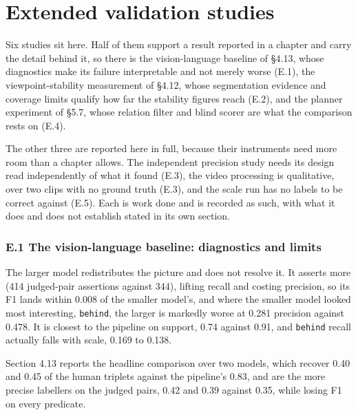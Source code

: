 \chapter{Extended validation studies}


Six studies sit here. Half of them support a result reported in a chapter and carry the detail behind it, so there is the vision-language baseline of \S{}4.13, whose diagnostics make its failure interpretable and not merely worse (E.1), the viewpoint-stability measurement of \S{}4.12, whose segmentation evidence and coverage limits qualify how far the stability figures reach (E.2), and the planner experiment of \S{}5.7, whose relation filter and blind scorer are what the comparison rests on (E.4).

The other three are reported here in full, because their instruments need more room than a chapter allows. The independent precision study needs its design read independently of what it found (E.3), the video processing is qualitative, over two clips with no ground truth (E.3), and the scale run has no labels to be correct against (E.5). Each is work done and is recorded as such, with what it does and does not establish stated in its own section.

\subsection{E.1 The vision-language baseline: diagnostics and limits}

The larger model redistributes the picture and does not resolve it. It asserts more (414 judged-pair assertions against 344), lifting recall and costing precision, so its F1 lands within 0.008 of the smaller model's, and where the smaller model looked most interesting, \texttt{behind}, the larger is markedly worse at 0.281 precision against 0.478. It is closest to the pipeline on support, 0.74 against 0.91, and \texttt{behind} recall actually falls with scale, 0.169 to 0.138.

Section 4.13 reports the headline comparison over two models, which recover 0.40 and 0.45 of the human triplets against the pipeline's 0.83, and are the more precise labellers on the judged pairs, 0.42 and 0.39 against 0.35, while losing F1 on every predicate.

